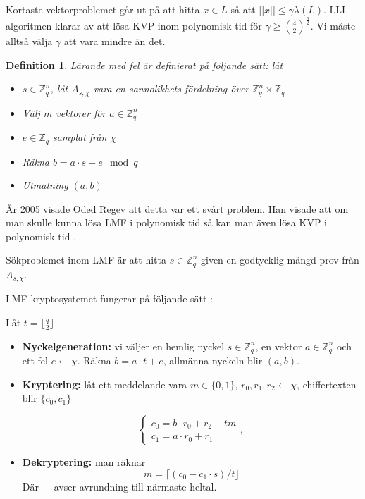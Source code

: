 \documentclass{paper}
\newtheorem{definition}{Definition}
\newcommand{\bZ}{\mathbb{Z}}
\begin{document}
Kortaste vektorproblemet går ut på att hitta $x \in L$ så att $||x|| \leq
\gamma \lambda (L)$. LLL algoritmen klarar av att lösa KVP inom polynomisk tid
för $\gamma \geq (\frac{4}{2})^{\frac{n}{2}}$. Vi måste alltså välja $\gamma$
att vara mindre än det.

\begin{definition}
    Lärande med fel är definierat på följande sätt: låt
    \begin{itemize}
        \item $s \in \bZ^n_q$, låt $A_{s,\chi}$ vara en sannolikhets fördelning
            över $\bZ^n_q \times \bZ_q$
        \item Välj $m$ vektorer för $a \in \bZ^n_q$
        \item $e \in \bZ_q$ samplat från $\chi$
        \item Räkna $b = a \cdot s + e \mod q$

        \item Utmatning $(a,b)$
    \end{itemize}
\end{definition}

År 2005 visade Oded Regev att detta var ett svårt problem. Han visade att om man
skulle kunna lösa LMF i polynomisk tid så kan man även lösa KVP i polynomisk
tid \citep{regev05}.

Sökproblemet inom LMF är att hitta $s \in \bZ^n_q$ given en godtycklig mängd
prov från $A_{s, \chi}$.

LMF kryptosystemet fungerar på följande sätt \citep{FPGA_post_quantum}:

Låt $t = \lfloor \frac{q}{2} \rfloor$
\begin{itemize}
    \item \textbf{Nyckelgeneration:} vi väljer en hemlig nyckel
        $s \in \bZ^n_q$, en vektor $a \in \bZ^n_q$ och ett fel $e \leftarrow
        \chi$. Räkna $b = a \cdot t + e$, allmänna nyckeln blir $(a,b)$.

    \item \textbf{Kryptering:} låt ett meddelande vara $m \in \{0,1\}$, $r_0,
        r_1, r_2 \leftarrow \chi$, chiffertexten blir $\{c_0, c_1\}$

        \[
            \begin{cases}
                c_0 = b \cdot r_0 + r_2 + t m\\
                c_1 = a \cdot r_0 + r_1
            \end{cases},
        \]

    \item \textbf{Dekryptering:} man räknar
        \[m = \lceil (c_0 - c_1 \cdot s) / t \rfloor \]
        Där $\lceil \rfloor$ avser avrundning till närmaste heltal.
\end{itemize}
\end{document}
